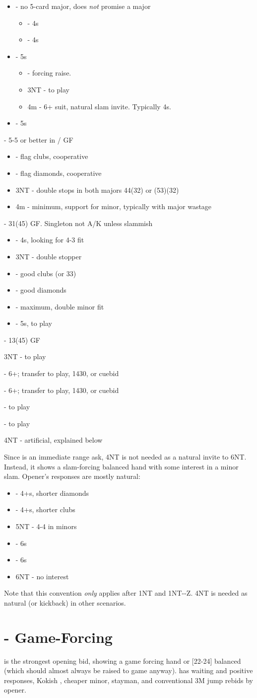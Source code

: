 \documentclass[12pt]{report}
\newcommand{\n}{\\}
\newcommand{\q}[1]{\multido{}{#1}{\qquad}}
\newcommand{\ul}[1]{\begin{itemize}#1\end{itemize}}
\newcommand{\li}[1]{\item[~] \q{#1}}
\newcommand{\bidsection}[2]{\section{\texorpdfstring{#1}{#2}}}
\begin{document}
{        \ul {
            \li0  - no 5-card major, does \textit{not} promise a major
            \ul {
                \li0 \he3 - 4\sp{}s
                \li0 \sp3 - 4\he{}s
            }
            \li0 \he3 - 5\he{}s
            \ul {
                \li0 \sp3 - forcing \he{} raise.
                \li0 3NT - to play
                \li0 4m - 6+ suit, natural slam invite.  Typically 4\sp{}s.
            }
            \li0 \sp3 - 5\sp{}s
        }
        \li0  - 5-5 or better in \cl{}/\di{} GF
        \ul {
            \li0  - flag clubs, cooperative
            \li0 \sp3 - flag diamonds, cooperative
            \li0 3NT - double stops in both majors 44(32) or (53)(32)
            \li0 4m - minimum, support for minor, typically with major wastage
        }
        \li0  - 31(45) GF.  Singleton not A/K unless slammish
        \ul {
            \li0  - 4\sp{}s, looking for 4-3 fit
            \li0 3NT - double stopper
            \li0 \cl4 - good clubs (or 33)
            \li0 \di4 - good diamonds
            \li0 \he4 - maximum, double minor fit
            \li0 \sp4 - 5\sp{}s, to play
        }
        \li0  - 13(45) GF
        \li0 3NT - to play
        \li0  - 6+\he{}; transfer to play, 1430, or cuebid
        \li0  - 6+\sp{}; transfer to play, 1430, or cuebid
        \li0  - to play
        \li0  - to play
        \li0 4NT - artificial, explained below
    }

    Since  is an immediate range ask, 4NT is not needed as a natural invite to 6NT.  Instead, it shows a slam-forcing balanced hand with some interest in a minor slam.  Opener's responses are mostly natural:

    \ul {
        \li0  - 4+\cl{}s, shorter diamonds
        \li0 \di5 - 4+\di{}s, shorter clubs
        \li0 5NT - 4-4 in minors
        \li0 \cl6 - 6\cl{}s
        \li0 \di6 - 6\di{}s
        \li0 6NT - no interest
    }

    Note that this convention \textit{only} applies after 1NT and 1NT--Z.  4NT is needed as natural (or \sp{} kickback) in other scenarios.
    
\bidsection{ - Game-Forcing}{2♣ - Game-Forcing} \label{2:8}

     is the strongest opening bid, showing a game forcing hand or [22-24] balanced (which should almost always be raised to game anyway).   has waiting and positive responses, Kokish , cheaper minor,  stayman, and conventional 3M jump rebids by opener.\n
    
\end{document}
